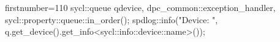 \begin{cppcode*}{firstnumber=110}
        sycl::queue q{device, dpc_common::exception_handler, sycl::property::queue::in_order()};
        spdlog::info("Device: {}", q.get_device().get_info<sycl::info::device::name>());
\end{cppcode*}
